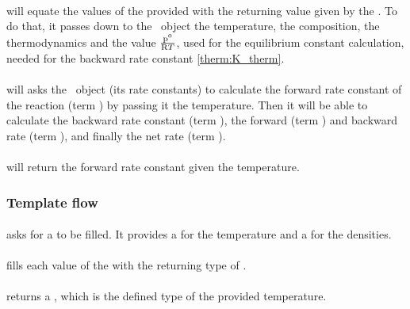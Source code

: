 \paragraph{\ReactionSet}
will equate the values of the provided  with
the returning value given by the \Reaction. To do that, it passes down to
the \Reaction\ object the temperature, the composition, the thermodynamics and
the value $\frac{\pz}{\Rg \Temp}$, used for the equilibrium constant calculation,
needed for the backward rate constant \eqref{therm:K_therm}.

\paragraph{\Reaction} will asks the \KineticsType\ object (its rate constants) to calculate
the forward rate constant of the reaction (term \fwdratecons[r]) by passing
it the temperature. Then it will be able 
to calculate the backward rate constant (term \bkwdratecons[r]), 
the forward (term \fwdrate[r]) and backward rate (term \bkwdrate[r]), 
and finally the net rate (term \rate[r]).

\paragraph{\KineticsType} will return the forward rate constant \fwdratecons[r] given
the temperature.

\subsubsection{Template flow}

\paragraph{\KineticsEvaluator} asks for a  to be filled. It
provides a  for the temperature and a  for
the densities.

\paragraph{\ReactionSet} fills each value of the  with
the returning type of \Reaction.

\paragraph{\Reaction} returns a , which is the defined type of the
provided temperature.

